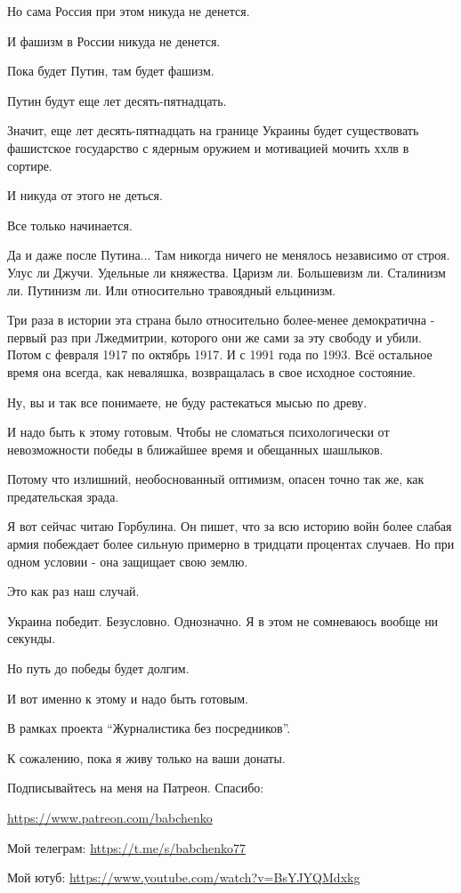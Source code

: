 Но сама Россия при этом никуда не денется. 

И фашизм в России никуда не денется. 

Пока будет Путин, там будет фашизм. 

Путин будут еще лет десять-пятнадцать. 

Значит, еще лет десять-пятнадцать на границе Украины будет существовать
фашистское государство с ядерным оружием и мотивацией мочить ххлв в сортире. 

И никуда от этого не деться. 

Все только начинается. 

Да и даже после Путина... Там никогда ничего не менялось независимо от строя.
Улус ли Джучи. Удельные ли княжества. Царизм ли. Большевизм ли. Сталинизм ли.
Путинизм ли. Или относительно травоядный ельцинизм. 

Три раза в истории эта страна было относительно более-менее демократична -
первый раз при Лжедмитрии, которого они же сами за эту свободу и убили. Потом с
февраля 1917 по октябрь 1917.  И с 1991 года по 1993. Всё остальное время она
всегда, как неваляшка, возвращалась в свое исходное состояние. 

Ну, вы и так все понимаете, не буду растекаться мысью по древу.  

И надо быть к этому готовым. Чтобы не сломаться психологически от невозможности победы в ближайшее время и обещанных шашлыков. 

Потому что излишний, необоснованный оптимизм, опасен точно так же, как
предательская зрада. 

Я вот сейчас читаю Горбулина. Он пишет, что за всю историю войн более слабая
армия побеждает более сильную примерно в тридцати процентах случаев. Но при
одном условии - она защищает свою землю. 

Это как раз наш случай. 

Украина победит. Безусловно. Однозначно. Я в этом не сомневаюсь вообще ни
секунды. 

Но путь до победы будет долгим. 

И вот именно к этому и надо быть готовым. 

В рамках проекта \enquote{Журналистика без посредников}.

К сожалению, пока я живу только на ваши донаты. 

Подписывайтесь на меня на Патреон. Спасибо:

\url{https://www.patreon.com/babchenko}

Мой телеграм: \url{https://t.me/s/babchenko77}

Мой ютуб: \url{https://www.youtube.com/watch?v=BsYJYQMdxkg}
